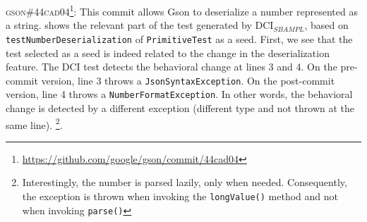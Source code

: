 \textsc{gson\#44cad04}\footnote{\url{https://github.com/google/gson/commit/44cad04}}: This commit allows Gson to deserialize a number represented as a string.
 shows the relevant part of the test generated by DCI$_{SBAMPL}$, based on \texttt{testNumberDeserialization} of \texttt{PrimitiveTest} as a seed.
First, we see that the test selected as a seed is indeed related to the change in the deserialization feature.
The DCI test detects the behavioral change at lines 3 and 4.
On the pre-commit version, line 3 throws a \texttt{JsonSyntaxException}.
On the post-commit version, line 4 throws a \texttt{NumberFormatException}.
In other words, the behavioral change is detected by a different exception (different type and not thrown at the same line).
\footnote{Interestingly, the number is parsed lazily, only when needed. Consequently, the exception is thrown when invoking the \texttt{longValue()} method and not when invoking \texttt{parse()}}.

